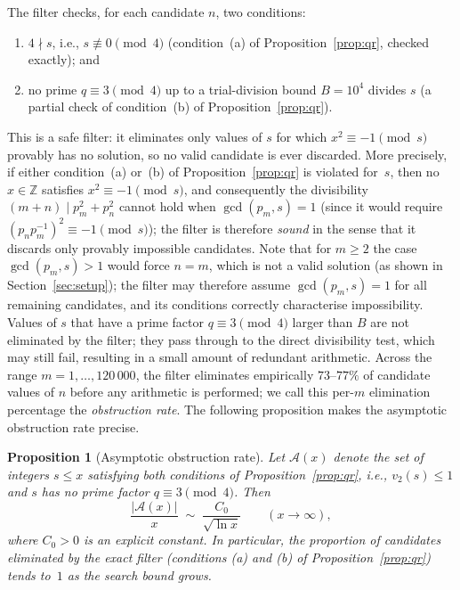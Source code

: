 \documentclass[pdflatex,sn-mathphys-num,Numbered]{sn-jnl}
\theoremstyle{thmstyleone}
\newtheorem{proposition}[theorem]{Proposition}
\theoremstyle{thmstylethree}
\theoremstyle{thmstyletwo}
\numberwithin{equation}{section}
\begin{document}
The filter checks, for each candidate $n$, two conditions:
\begin{enumerate}
	\item[(a)] $4 \nmid s$, i.e., $s \not\equiv 0 \pmod{4}$
	(condition~(a) of Proposition~\ref{prop:qr}, checked exactly); and
	\item[(b$'$)] no prime $q \equiv 3 \pmod{4}$ up to a trial-division
	bound $B = 10^4$ divides $s$ (a partial check of
	condition~(b) of Proposition~\ref{prop:qr}).
\end{enumerate}
This is a safe filter: it eliminates only values of $s$ for which
$x^2 \equiv -1 \pmod{s}$ provably has no solution, so no valid
candidate is ever discarded.
More precisely, if either condition~(a) or~(b) of
Proposition~\ref{prop:qr} is violated for~$s$, then no
$x \in \mathbb{Z}$ satisfies $x^2 \equiv -1 \pmod{s}$, and
consequently the divisibility $(m+n) \mid p_m^2 + p_n^2$ cannot hold
when $\gcd(p_m, s) = 1$ (since it would require
$(p_n p_m^{-1})^2 \equiv -1 \pmod{s}$); the filter is therefore
\emph{sound} in the sense that it discards only provably impossible
candidates.
Note that for $m \geq 2$ the case $\gcd(p_m, s) > 1$ would force
$n = m$, which is not a valid solution (as shown in
Section~\ref{sec:setup}); the filter may therefore assume
$\gcd(p_m, s) = 1$ for all remaining candidates, and its conditions
correctly characterise impossibility.
Values of $s$ that have a prime factor $q \equiv 3 \pmod{4}$ larger
than $B$ are not eliminated by the filter; they pass through to the
direct divisibility test, which may still fail, resulting in a small
amount of redundant arithmetic.
Across the range $m = 1, \ldots, 120\,000$, the filter eliminates
empirically $73$--$77\%$ of candidate values of $n$ before any
arithmetic is performed; we call this per-$m$ elimination percentage
the \emph{obstruction rate}.
The following proposition makes the asymptotic obstruction rate precise.

\begin{proposition}[Asymptotic obstruction rate]\label{prop:obstruction}
Let $\mathcal{A}(x)$ denote the set of integers $s \leq x$ satisfying
both conditions of Proposition~\textup{\ref{prop:qr}}, i.e.,
$v_2(s) \leq 1$ and $s$ has no prime factor $q \equiv 3 \pmod{4}$.
Then
\[
\frac{|\mathcal{A}(x)|}{x}
\;\sim\;
\frac{C_0}{\sqrt{\ln x}}
\qquad (x \to \infty),
\]
where $C_0 > 0$ is an explicit constant.
In particular, the proportion of candidates eliminated by the exact
filter \textup{(}conditions \textup{(a)} and \textup{(b)} of
Proposition~\textup{\ref{prop:qr})} tends to~$1$ as the search
bound grows.
\end{proposition}
\end{document}
